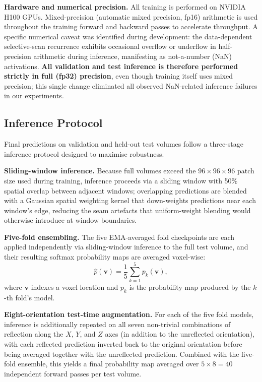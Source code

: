 \documentclass[pdflatex,sn-mathphys-num]{sn-jnl}
\begin{document}
\textbf{Hardware and numerical precision.} All training is performed
on NVIDIA H100 GPUs. Mixed-precision (automatic mixed precision, fp16)
arithmetic is used throughout the training forward and backward
passes to accelerate throughput. A specific numerical caveat was
identified during development: the data-dependent selective-scan
recurrence exhibits occasional overflow or underflow in
half-precision arithmetic during inference, manifesting as
not-a-number (NaN) activations. \textbf{All validation and test
inference is therefore performed strictly in full (fp32) precision},
even though training itself uses mixed precision; this single change
eliminated all observed NaN-related inference failures in our
experiments.

\subsection{Inference Protocol}\label{ssec:inference}
Final predictions on validation and held-out test volumes follow a
three-stage inference protocol designed to maximise robustness.

\textbf{Sliding-window inference.} Because full volumes exceed the
$96 \times 96 \times 96$ patch size used during training, inference proceeds via a
sliding window with 50\% spatial overlap between adjacent windows;
overlapping predictions are blended with a Gaussian spatial weighting
kernel that down-weights predictions near each window's edge, reducing
the seam artefacts that uniform-weight blending would otherwise
introduce at window boundaries.

\textbf{Five-fold ensembling.} The five EMA-averaged fold checkpoints
are each applied independently via sliding-window inference to the
full test volume, and their resulting softmax probability maps are
averaged voxel-wise:
\begin{equation}
\hat{p}(\mathbf{v}) = \frac{1}{5}\sum_{k=1}^{5} p_k(\mathbf{v}),
\label{eq:ensemble}
\end{equation}
where $\mathbf{v}$ indexes a voxel location and $p_k$ is the
probability map produced by the $k$-th fold's model.

\textbf{Eight-orientation test-time augmentation.} For each of the
five fold models, inference is additionally repeated on all seven
non-trivial combinations of reflection along the $X$, $Y$, and $Z$
axes (in addition to the unreflected orientation), with each reflected
prediction inverted back to the original orientation before being
averaged together with the unreflected prediction. Combined with the
five-fold ensemble, this yields a final probability map averaged over
$5 \times 8 = 40$ independent forward passes per test volume.
\end{document}
